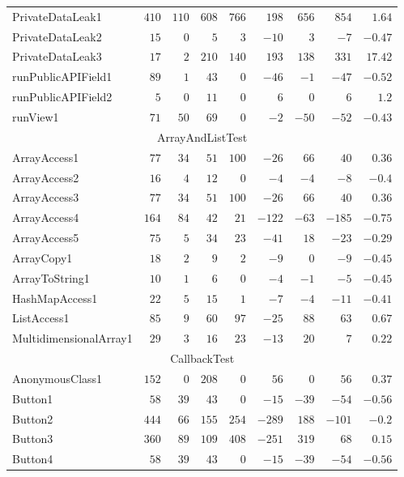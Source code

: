 \documentclass[../draft.tex]{subfiles}
\newcommand{\tsubEight}[1]{\multicolumn{9}{c}{#1}\\\hline}
\begin{document}
\begin{longtable}{l | r | r | r | r | r | r | r | r}
        PrivateDataLeak1 & $410$ & $110$ & $608$ & $766$ & $198$ & $656$ & $854$ & $1.64$\\
        PrivateDataLeak2 & $15$ & $0$ & $5$ & $3$ & $-10$ & $3$ & $-7$ & $-0.47$\\
        PrivateDataLeak3 & $17$ & $2$ & $210$ & $140$ & $193$ & $138$ & $331$ & $17.42$\\
        runPublicAPIField1 & $89$ & $1$ & $43$ & $0$ & $-46$ & $-1$ & $-47$ & $-0.52$\\
        runPublicAPIField2 & $5$ & $0$ & $11$ & $0$ & $6$ & $0$ & $6$ & $1.2$\\
        runView1 & $71$ & $50$ & $69$ & $0$ & $-2$ & $-50$ & $-52$ & $-0.43$\\
        \hline
        \tsubEight{ArrayAndListTest}
        ArrayAccess1 & $77$ & $34$ & $51$ & $100$ & $-26$ & $66$ & $40$ & $0.36$\\
        ArrayAccess2 & $16$ & $4$ & $12$ & $0$ & $-4$ & $-4$ & $-8$ & $-0.4$\\
        ArrayAccess3 & $77$ & $34$ & $51$ & $100$ & $-26$ & $66$ & $40$ & $0.36$\\
        ArrayAccess4 & $164$ & $84$ & $42$ & $21$ & $-122$ & $-63$ & $-185$ & $-0.75$\\
        ArrayAccess5 & $75$ & $5$ & $34$ & $23$ & $-41$ & $18$ & $-23$ & $-0.29$\\
        ArrayCopy1 & $18$ & $2$ & $9$ & $2$ & $-9$ & $0$ & $-9$ & $-0.45$\\
        ArrayToString1 & $10$ & $1$ & $6$ & $0$ & $-4$ & $-1$ & $-5$ & $-0.45$\\
        HashMapAccess1 & $22$ & $5$ & $15$ & $1$ & $-7$ & $-4$ & $-11$ & $-0.41$\\
        ListAccess1 & $85$ & $9$ & $60$ & $97$ & $-25$ & $88$ & $63$ & $0.67$\\
        MultidimensionalArray1 & $29$ & $3$ & $16$ & $23$ & $-13$ & $20$ & $7$ & $0.22$\\
        \hline
        \tsubEight{CallbackTest}
        AnonymousClass1 & $152$ & $0$ & $208$ & $0$ & $56$ & $0$ & $56$ & $0.37$\\
        Button1 & $58$ & $39$ & $43$ & $0$ & $-15$ & $-39$ & $-54$ & $-0.56$\\
        Button2 & $444$ & $66$ & $155$ & $254$ & $-289$ & $188$ & $-101$ & $-0.2$\\
        Button3 & $360$ & $89$ & $109$ & $408$ & $-251$ & $319$ & $68$ & $0.15$\\
        Button4 & $58$ & $39$ & $43$ & $0$ & $-15$ & $-39$ & $-54$ & $-0.56$\\

\end{longtable}
\end{document}
